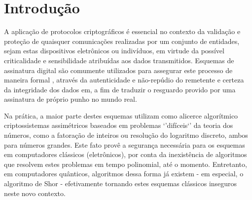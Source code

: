 \documentclass{ufsctex/ufsctex}
\begin{document}

\chapter{Introdução}

A aplicação de protocolos criptográficos é essencial no contexto da validação e
proteção de quaisquer comunicações realizadas por um conjunto de entidades,
sejam estas dispositivos eletrônicos ou indivíduos, em virtude da possível
criticalidade e sensibilidade atribuídas aos dados transmitidos. Esquemas de
assinatura digital são comumente utilizados para assegurar este processo de
maneira formal \cite{Goldreich:2004:FCV:975541}, através da autenticidade e
não-repúdio do remetente e certeza da integridade dos dados em, a fim de
traduzir o resguardo provido por uma assinatura de próprio punho no mundo real.

Na prática, a maior parte destes esquemas utilizam como alicerce algorítmico
criptossistemas assimétricos baseados em problemas `'difíceis`' da teoria
dos números, como a fatoração de inteiros ou resolução do logaritmo discreto,
ambos para números grandes. Este fato provê a segurança necessária para os
esquemas em computadores clássicos (eletrônicos), por conta da inexistência de
algoritmos que resolvem estes problemas em tempo polinomial, até o momento.
Entretanto, em computadores quânticos, algoritmos dessa forma já existem - em
especial, o algoritmo de Shor \cite{Shor:1997:PAP:264393.264406} - efetivamente
tornando estes esquemas clássicos inseguros neste novo contexto.
\end{document}
